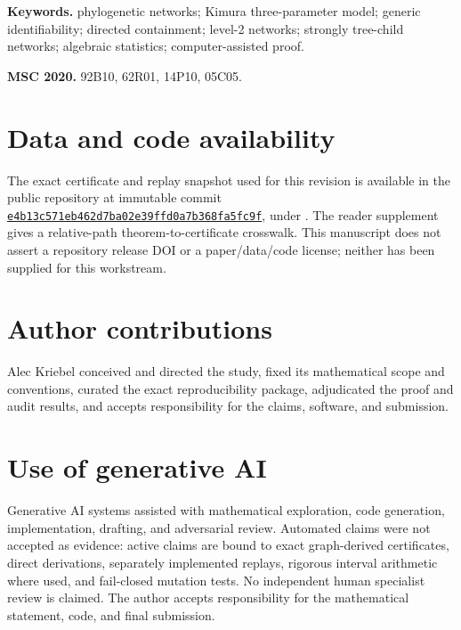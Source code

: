 \documentclass[11pt]{article}
\theoremstyle{remark}
\newcommand{\1}{\mathbf 1}
\begin{document}
\noindent\textbf{Keywords.} phylogenetic networks; Kimura three-parameter
model; generic identifiability; directed containment; level-2 networks;
strongly tree-child networks; algebraic statistics; computer-assisted proof.

\medskip
\noindent\textbf{MSC 2020.} 92B10, 62R01, 14P10, 05C05.



















\section*{Data and code availability}

The exact certificate and replay snapshot used for this revision is available
in the public repository at immutable commit
\href{https://github.com/AlecKriebel/Math/tree/e4b13c571eb462d7ba02e39ffd0a7b368fa5fc9f/k3p_level2_identifiability_final}
{\texttt{e4b13c571eb462d7ba02e39ffd0a7b368fa5fc9f}}, under
.  The reader supplement gives a
relative-path theorem-to-certificate crosswalk.  This manuscript does not
assert a repository release DOI or a paper/data/code license; neither has
been supplied for this workstream.

\section*{Author contributions}

Alec Kriebel conceived and directed the study, fixed its mathematical scope
and conventions, curated the exact reproducibility package, adjudicated the
proof and audit results, and accepts responsibility for the claims,
software, and submission.

\section*{Use of generative AI}

Generative AI systems assisted with mathematical exploration, code
generation, implementation, drafting, and adversarial review.  Automated
claims were not accepted as evidence: active claims are bound to exact
graph-derived certificates, direct derivations, separately implemented
replays, rigorous interval arithmetic where used, and fail-closed mutation
tests.  No independent human specialist review is claimed.  The author
accepts responsibility for the mathematical statement, code, and final
submission.

{\small
\raggedright


}
\end{document}
